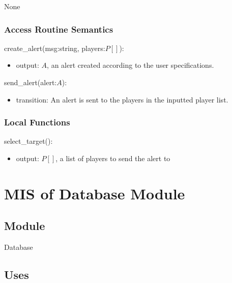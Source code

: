 \documentclass[12pt, titlepage]{article}
\begin{document}

None

\subsubsection{Access Routine Semantics}

\noindent create\_alert(msg:string, players:$P[]$):
\begin{itemize}
\item output: $A$, an alert created according to the user specifications.
\end{itemize}

\noindent send\_alert(alert:$A$):
\begin{itemize}
\item transition: An alert is sent to the players in the inputted player list.
\end{itemize}

\subsubsection{Local Functions}

\noindent select\_target():
\begin{itemize}
\item output: $P[]$, a list of players to send the alert to
\end{itemize}

\newpage

\section{MIS of Database Module} \label{mDB}



\subsection{Module}

Database

\subsection{Uses}
\end{document}
